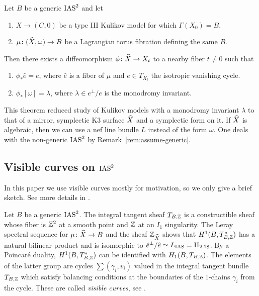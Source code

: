 \documentclass{amsart}
\begin{document}
\begin{theorem}
  \label{thm:EF-mirror}
  Let $B$ be a generic $\operatorname{IAS}^2$ and let 
  \begin{enumerate}
  \item $X\to (C,0)$ be a type III Kulikov model for which $\Gamma(X_0)=B$.
  \item $\mu\colon ({\widehat X},\omega)\to B$ be a Lagrangian torus fibration defining
    the same $B$.
  \end{enumerate}
  Then there exists a diffeomorphism $\phi\colon {\widehat X}\to X_t$ to a
  nearby fiber $t\ne0$ such that
  \begin{enumerate}
  \item [(a)] $\phi_* \hat e = e$, where $\hat e$ is a fiber of $\mu$ and $e\in
    T_{X_t}$ the isotropic vanishing cycle.
  \item [(b)] $\phi_*[\omega] = \lambda$, where $\lambda\in e^\perp/e$
    is the monodromy invariant.
  \end{enumerate}
\end{theorem}

This theorem reduced study of Kulikov models with a monodromy
invariant $\lambda$ to that of a mirror, symplectic K3 surface ${\widehat X}$
and a symplectic form on it. If ${\widehat X}$ is algebraic, then we can use a
nef line bundle $L$ instead of the form $\omega$. One deals with the
non-generic $\operatorname{IAS}^2$ by Remark~\ref{rem:assume-generic}. 

\subsection{Visible curves on $\operatorname{IAS}^2$}
\label{sec:visible-curves}

In this paper we use visible curves mostly for motivation, so we only
give a brief sketch. See more details in
\cite{alexeev2019stable-pair}.

Let $B$ be a generic $\operatorname{IAS}^2$. The integral tangent sheaf $T_{B,{\mathbb Z}}$ is
a constructible sheaf whose fiber is ${\mathbb Z}^2$ at a smooth point and
${\mathbb Z}$ at an $I_1$ singularity. The Leray spectral sequence for
$\mu\colon{\widehat X}\to B$ and the sheaf ${\mathbb Z}_{{\widehat X}}$ shows that
$H^1(B,T^*_{B,{\mathbb Z}})$ has a natural bilinear product and is isomorphic to
$\hat e^\perp/\hat e \simeq L_{\rm IAS} = {\rm II}_{2,18}$. By a Poincar\'e duality,
$H^1(B,T^*_{B,{\mathbb Z}})$ can be identified with $H_1(B,T_{B,{\mathbb Z}})$.
The elements of the latter group are cycles $\sum (\gamma_i,v_i)$
valued in the integral tangent bundle $T_{B,{\mathbb Z}}$ which satisfy
balancing conditions at the boundaries of the $1$-chains $\gamma_i$ from the cycle.
These are called \emph{visible curves}, see \cite[Con.~2.39]{alexeev2019stable-pair}.
\end{document}
